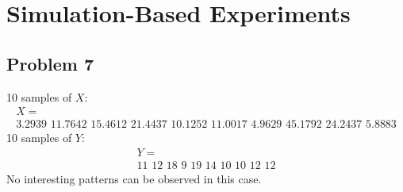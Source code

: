 \documentclass{article}
\begin{document}
\section*{Simulation-Based Experiments}
	\subsection*{Problem 7}
		10 samples of $X$:
		\begin{gather*}
			X = \\
			\text{3.2939 11.7642 15.4612 21.4437 10.1252 11.0017 4.9629 45.1792 24.2437 5.8883}
		\end{gather*}
		10 samples of $Y$:
		\begin{gather*}
			Y = \\
			\text{11 12 18 9 19 14 10 10 12 12}
		\end{gather*}
		No interesting patterns can be observed in this case.
\end{document}
